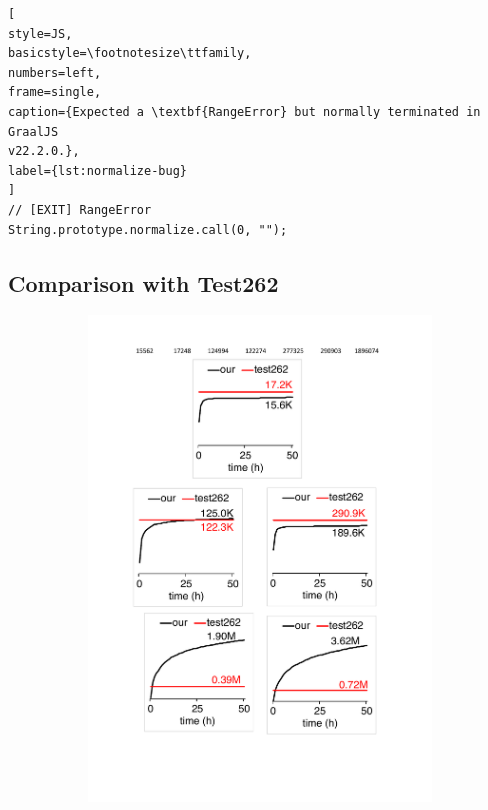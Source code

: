 \begin{lstlisting}[
style=JS,
basicstyle=\footnotesize\ttfamily,
numbers=left,
frame=single,
caption={Expected a \textbf{RangeError} but normally terminated in GraalJS
v22.2.0.},
label={lst:normalize-bug}
]
// [EXIT] RangeError
String.prototype.normalize.call(0, "");
\end{lstlisting}


\subsection{Comparison with Test262}\label{sec:compare-test262}

\begin{figure}
  \centering
  \begin{subfigure}{0.19\textwidth}
    \centering
    \includegraphics[width=\textwidth]{img/cov-0}

\end{subfigure}
\end{figure}

